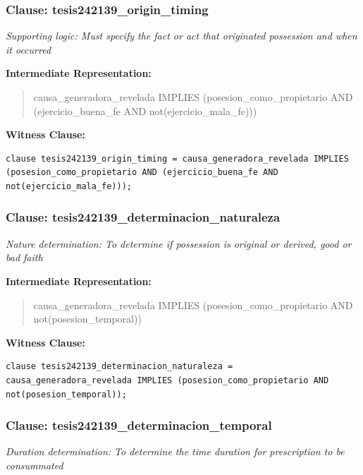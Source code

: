 \documentclass[11pt,a4paper]{article}
\begin{document}
\subsubsection{Clause: tesis242139\_origin\_timing}

\textit{Supporting logic: Must specify the fact or act that originated possession and when it occurred}

\textbf{Intermediate Representation:}

\begin{quote}
causa\_generadora\_revelada IMPLIES (posesion\_como\_propietario AND (ejercicio\_buena\_fe AND not(ejercicio\_mala\_fe)))
\end{quote}

\textbf{Witness Clause:}

\begin{lstlisting}[style=witnessstyle, language=Witness]
clause tesis242139_origin_timing = causa_generadora_revelada IMPLIES (posesion_como_propietario AND (ejercicio_buena_fe AND not(ejercicio_mala_fe)));
\end{lstlisting}

\subsubsection{Clause: tesis242139\_determinacion\_naturaleza}

\textit{Nature determination: To determine if possession is original or derived, good or bad faith}

\textbf{Intermediate Representation:}

\begin{quote}
causa\_generadora\_revelada IMPLIES (posesion\_como\_propietario AND not(posesion\_temporal))
\end{quote}

\textbf{Witness Clause:}

\begin{lstlisting}[style=witnessstyle, language=Witness]
clause tesis242139_determinacion_naturaleza = causa_generadora_revelada IMPLIES (posesion_como_propietario AND not(posesion_temporal));
\end{lstlisting}

\subsubsection{Clause: tesis242139\_determinacion\_temporal}

\textit{Duration determination: To determine the time duration for prescription to be consummated}
\end{document}
